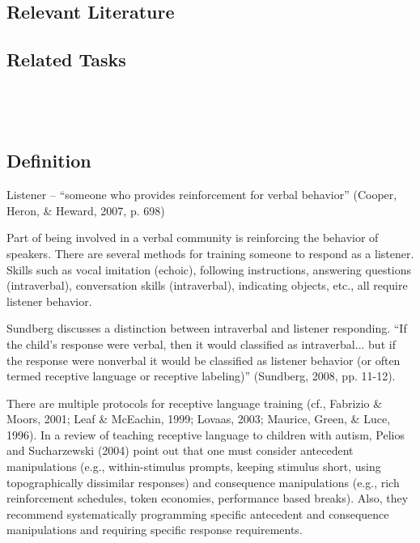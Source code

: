 \subsection{Relevant Literature}
\begin{refsection}
\nocite{cooper2007applied,
    partington1993teaching,
    skinner1957verbal,
    sundberg1998teaching,
    vedora2009teaching}
\printbibliography[heading=none]
\end{refsection}
%
\subsection{Related Tasks}
\fourdThirteen{}\\
\fourFKFourtySix{}\\
%
%
%
%
%
%
%
%
%
%
\section{\fourdFourteen{}}
\subsection{Definition}
Listener – ``someone who provides reinforcement for verbal behavior'' (Cooper, Heron, \& Heward, 2007, p. 698)

Part of being involved in a verbal community is reinforcing the behavior of speakers. There are several methods for training someone to respond as a listener. Skills such as vocal imitation (echoic), following instructions, answering questions (intraverbal), conversation skills (intraverbal), indicating objects, etc., all require listener behavior. 

Sundberg discusses a distinction between intraverbal and listener responding. ``If the child's response were verbal, then it would classified as intraverbal... but if the response were nonverbal it would be classified as listener behavior (or often termed receptive language or receptive labeling)'' (Sundberg, 2008, pp. 11-12).

There are multiple protocols for receptive language training (cf., Fabrizio \& Moors, 2001; Leaf \& McEachin, 1999; Lovaas, 2003; Maurice, Green, \& Luce, 1996). In a review of teaching receptive language to children with autism, Pelios and Sucharzewski (2004) point out that one must consider antecedent manipulations (e.g., within-stimulus prompts, keeping stimulus short, using topographically dissimilar responses) and consequence manipulations (e.g., rich reinforcement schedules, token economies, performance based breaks).  Also, they recommend systematically programming specific antecedent and consequence manipulations and requiring specific response requirements.

